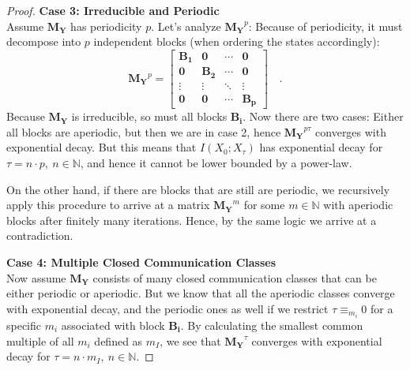 \documentclass[../../main.tex]{subfiles}
\begin{document}
\begin{proof}
        \textbf{Case 3: Irreducible and Periodic} \\
        Assume $\bm{M_Y}$ has periodicity $p$. Let's analyze $\bm{M_Y}^p$: Because of periodicity, it must decompose into $p$ independent blocks (when ordering the states accordingly):
        \[
            \bm{M_Y}^p = 
            \begin{bmatrix}
            \bm{B_1} & \bm{0} & \cdots & \bm{0} \\
            \bm{0} & \bm{B_2} & \cdots & \bm{0} \\
            \vdots & \vdots & \ddots & \vdots \\
            \bm{0} & \bm{0} & \cdots & \bm{B_p}
            \end{bmatrix}
            \quad .
        \]
        Because $\bm{M_Y}$ is irreducible, so must all blocks $\bm{B_i}$. Now there are two cases: Either all blocks are aperiodic, but then we are in case 2, hence $\bm{M_Y}^{p \tau}$ converges with exponential decay. But this means that $I(X_0; X_\tau)$ has exponential decay for $\tau = n \cdot p, \ n \in \mathbb{N}$, and hence it cannot be lower bounded by a power-law.

        On the other hand, if there are blocks that are still are periodic, we recursively apply this procedure to arrive at a matrix $\bm{M_Y}^m$ for some $m \in \mathbb{N}$ with aperiodic blocks after finitely many iterations. Hence, by the same logic we arrive at a contradiction.

        \textbf{Case 4: Multiple Closed Communication Classes} \\
        Now assume $\bm{M_Y}$ consists of many closed communication classes that can be either periodic or aperiodic. But we know that all the aperiodic classes converge with exponential decay, and the periodic ones as well if we restrict $\tau \equiv_{m_i} 0$ for a specific $m_i$ associated with block $\bm{B_i}$. By calculating the smallest common multiple of all $m_i$ defined as $m_I$, we see that $\bm{M_Y}^\tau$ converges with exponential decay for $\tau = n \cdot m_I, \ n \in \mathbb{N}$.


\end{proof}
\end{document}
